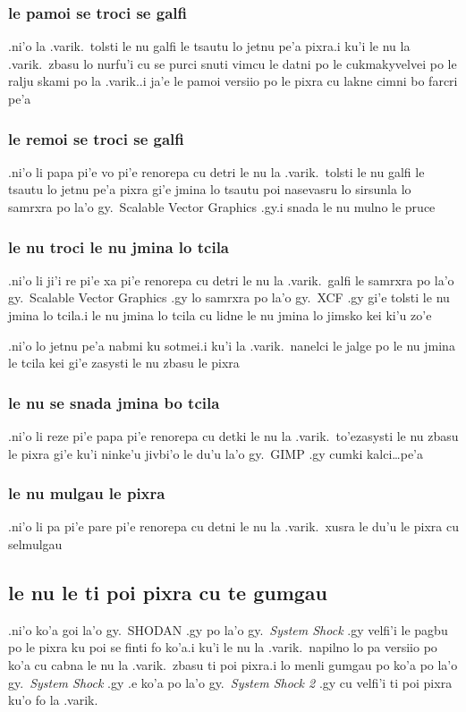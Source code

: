 \documentclass{report}
\begin{document}
\subsubsection{le pamoi se troci se galfi}
.ni'o la .varik.\ tolsti le nu galfi le tsautu lo jetnu pe'a pixra\@  .i ku'i le nu la .varik.\ zbasu lo nurfu'i cu se purci snuti vimcu le datni po le cukmakyvelvei po le ralju skami po la .varik.\@  .i ja'e le pamoi versiio po le pixra cu lakne cimni bo farcri pe'a

\subsubsection{le remoi se troci se galfi}
.ni'o li papa pi'e vo pi'e renorepa cu detri le nu la .varik.\ tolsti le nu galfi le tsautu lo jetnu pe'a pixra gi'e jmina lo tsautu poi nasevasru lo sirsunla lo samrxra po la'o gy.\ Scalable Vector Graphics .gy\@  .i snada le nu mulno le pruce

\subsubsection{le nu troci le nu jmina lo tcila}
.ni'o li ji'i re pi'e xa pi'e renorepa cu detri le nu la .varik.\ galfi le samrxra po la'o gy.\ Scalable Vector Graphics .gy lo samrxra po la'o gy.\ XCF .gy gi'e tolsti le nu jmina lo tcila\@  .i le nu jmina lo tcila cu lidne le nu jmina lo jimsko kei ki'u zo'e

.ni'o lo jetnu pe'a nabmi ku sotmei\@  .i ku'i la .varik.\ nanelci le jalge po le nu jmina le tcila kei gi'e zasysti le nu zbasu le pixra

\subsubsection{le nu se snada jmina bo tcila}
.ni'o li reze pi'e papa pi'e renorepa cu detki le nu la .varik.\ to'ezasysti le nu zbasu le pixra gi'e ku'i ninke'u jivbi'o le du'u la'o gy.\ GIMP .gy cumki kalci\ldots pe'a

\subsubsection{le nu mulgau le pixra}
.ni'o li pa pi'e pare pi'e renorepa cu detni le nu la .varik.\ xusra le du'u le pixra cu selmulgau

\subsection{le nu le ti poi pixra cu te gumgau}
.ni'o ko'a goi la'o gy.\ SHODAN .gy po la'o gy.\ \textit{System Shock} .gy velfi'i le pagbu po le pixra ku poi se finti fo ko'a\@  .i ku'i le nu la .varik.\ napilno lo pa versiio po ko'a cu cabna le nu la .varik.\ zbasu ti poi pixra\@  .i lo menli gumgau po ko'a po la'o gy.\ \textit{System Shock} .gy .e ko'a po la'o gy.\ \textit{System Shock 2} .gy cu velfi'i ti poi pixra ku'o fo la .varik.
\end{document}
